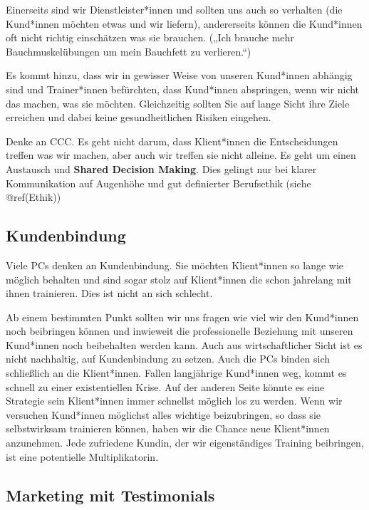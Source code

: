 \documentclass[
  letterpaper,
  DIV=11,
  numbers=noendperiod]{scrreprt}
\begin{document}
Einerseits sind wir Dienstleister*innen und sollten uns auch so
verhalten (die Kund*innen möchten etwas und wir liefern), andererseits
können die Kund*innen oft nicht richtig einschätzen was sie brauchen.
(„Ich brauche mehr Bauchmuskelübungen um mein Bauchfett zu verlieren.``)

Es kommt hinzu, dass wir in gewisser Weise von unseren Kund*innen
abhängig sind und Trainer*innen befürchten, dass Kund*innen abspringen,
wenn wir nicht das machen, was sie möchten. Gleichzeitig sollten Sie auf
lange Sicht ihre Ziele erreichen und dabei keine gesundheitlichen
Risiken eingehen.

Denke an CCC. Es geht nicht darum, dass Klient*innen die Entscheidungen
treffen was wir machen, aber auch wir treffen sie nicht alleine. Es geht
um einen Austausch und \textbf{Shared Decision Making}. Dies gelingt nur
bei klarer Kommunikation auf Augenhöhe und gut definierter Berufsethik
(siehe @ref(Ethik))

\subsection{Kundenbindung}\label{kundenbindung}

Viele PCs denken an Kundenbindung. Sie möchten Klient*innen so lange wie
möglich behalten und sind sogar stolz auf Klient*innen die schon
jahrelang mit ihnen trainieren. Dies ist nicht an sich schlecht.

Ab einem bestimmten Punkt sollten wir uns fragen wie viel wir den
Kund*innen noch beibringen können und inwieweit die professionelle
Beziehung mit unseren Kund*innen noch beibehalten werden kann. Auch aus
wirtschaftlicher Sicht ist es nicht nachhaltig, auf Kundenbindung zu
setzen. Auch die PCs binden sich schließlich an die Klient*innen. Fallen
langjährige Kund*innen weg, kommt es schnell zu einer existentiellen
Krise. Auf der anderen Seite könnte es eine Strategie sein Klient*innen
immer schnellst möglich los zu werden. Wenn wir versuchen Kund*innen
möglichst alles wichtige beizubringen, so dass sie selbstwirksam
trainieren können, haben wir die Chance neue Klient*innen anzunehmen.
Jede zufriedene Kundin, der wir eigenständiges Training beibringen, ist
eine potentielle Multiplikatorin.

\subsection{Marketing mit
Testimonials}\label{marketing-mit-testimonials}
\end{document}

